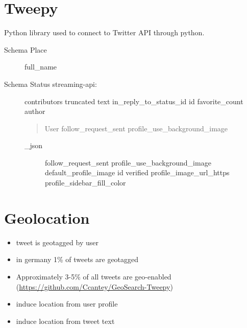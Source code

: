 \documentclass[letterpaper,10pt,english]{sphinxmanual}
\begin{document}
\section{Tweepy}
\label{twitter:tweepy}
Python library used to connect to Twitter API through python.
\begin{description}
\item[{Schema Place}] \leavevmode
full\_name

\item[{Schema Status streaming-api:}] \leavevmode
contributors
truncated
text
in\_reply\_to\_status\_id
id
favorite\_count
author
\begin{quote}

User
follow\_request\_sent
profile\_use\_background\_image
\end{quote}
\begin{description}
\item[{\_json}] \leavevmode
follow\_request\_sent
profile\_use\_background\_image
default\_profile\_image
id
verified
profile\_image\_url\_https
profile\_sidebar\_fill\_color

\end{description}

\end{description}


\section{Geolocation}
\label{twitter:geolocation}\begin{itemize}
\item {} 
tweet is geotagged by user

\item {} 
in germany 1\% of tweets are geotagged

\item {} 
Approximately 3-5\% of all tweets are geo-enabled (\href{https://github.com/Ccantey/GeoSearch-Tweepy}{https://github.com/Ccantey/GeoSearch-Tweepy})

\item {} 
induce location from user profile

\item {} 
induce location from tweet text

\end{itemize}
\end{document}
